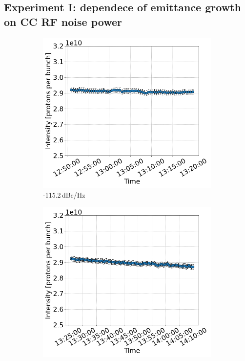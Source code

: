  \subsection{Experiment I: dependece of emittance growth on CC RF noise power}\label{subsec:2022_exp1_intensity}

 \begin{figure}[htp]
    \centering
    \begin{subfigure}{.45\textwidth}
        \centering
        \includegraphics[width=.95\linewidth]{images/app_e/intensity_cc_md_16May22_coast_2.png}  
        \caption{-115.2\,dBc/Hz}
    \end{subfigure}
    \begin{subfigure}{.45\textwidth}
        \centering
        \includegraphics[width=.95\linewidth]{images/app_e/intensity_cc_md_16May22_coast_3.png}  

\end{subfigure}
\end{figure}
